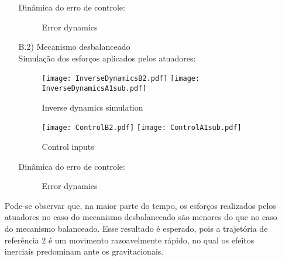\begin{itemize}
\begin{itemize}
Din\^amica do erro de controle:

\begin{figure}[H]
\centering
{}
\quad
{}
%
\caption{Error dynamics}
\label{fig:figure}
\end{figure}

\item[B.2)] Mecanismo desbalanceado \\

Simula\c{c}\~ao dos esfor\c{c}os aplicados pelos atuadores:

\begin{figure}[H]
\centering
\begin{minipage}[b]{0.45\linewidth}
\texttt{[image: InverseDynamicsB2.pdf]}
\texttt{[image: InverseDynamicsA1sub.pdf]}
\label{fig:InverseDynamicsB2}
\caption{Inverse dynamics simulation}
\end{minipage}
\quad
\begin{minipage}[b]{0.45\linewidth}
\texttt{[image: ControlB2.pdf]}
\texttt{[image: ControlA1sub.pdf]}
\label{fig:ControlB2}
\caption{Control inputs}
\end{minipage}
\end{figure}

Din\^amica do erro de controle:

\begin{figure}[H]
\centering
{}
\quad
{}
%
\caption{Error dynamics}
\label{fig:figure}
\end{figure}


\end{itemize}

Pode-se observar que, na maior parte do tempo, os esfor\c{c}os realizados pelos atuadores no caso do mecanismo desbalanceado s\~ao menores do que no caso do mecanismo balanceado. Esse resultado \'e esperado, pois a trajet\'oria de refer\^encia 2 \'e um movimento razoavelmente r\'apido, no qual os efeitos inerciais predominam ante os gravitacionais.

\end{itemize}